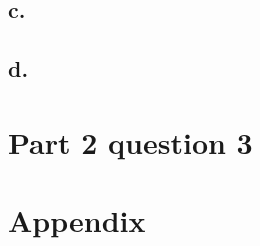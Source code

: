 \documentclass{article}
\newcommand{\xxx}[1]{\textcolor{red}{#1}}
\theoremstyle{plain}
\theoremstyle{definition}
\theoremstyle{remark}
\begin{document}
\subsection*{c.}

\subsection*{d.}

\section{Part 2 question 3}
%
%
%
\newpage
\section*{Appendix}
\end{document}
